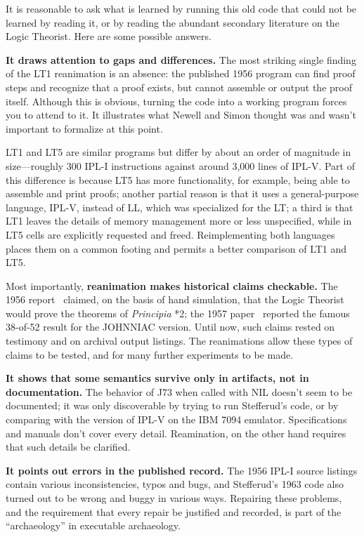 \documentclass[journal]{IEEEtran}
\begin{document}
%
%

It is reasonable to ask what is learned by running this old code that
could not be learned by reading it, or by reading the abundant
secondary literature on the Logic Theorist. Here are some
possible answers.

\textbf{It draws attention to gaps and differences.}
The most striking single finding of the LT1 reanimation is an
absence: the published 1956 program can find proof steps and 
recognize that a proof exists, but cannot assemble
or output the proof itself.  Although this is obvious, turning
the code into a working program forces you to attend to it. 
It illustrates what Newell and Simon
thought was and wasn't important to formalize at this point.

LT1 and LT5 are similar programs but
differ by about an order of magnitude in size---roughly 300
IPL-I instructions against around 3,000 lines of
IPL-V.  Part of this difference is because LT5 has more
functionality, for example, being able to
assemble and print proofs; another partial reason is that it uses
a general-purpose language, IPL-V, instead of LL, which was
specialized for the LT; a third is that LT1 leaves the details
of memory management more or less unspecified, while in LT5
cells are explicitly requested and freed.  Reimplementing 
both languages places them on a common footing and permits a 
better comparison of LT1 and LT5.

Most importantly, \textbf{reanimation makes historical claims checkable.} The 1956
report~\cite{cip1956} claimed, on the basis of hand simulation, that the Logic
Theorist would prove the theorems of \textit{Principia} *2; the 
1957 paper~\cite{LT1957} reported the famous 38-of-52 result for the JOHNNIAC version.
Until now, such claims rested on testimony and on archival output
listings.  The reanimations allow these types of claims to be tested, 
and for many further experiments to be made.

\textbf{It shows that some semantics survive only in artifacts, not
in documentation.}  The behavior of J73 when called with NIL
doesn't seem to be documented; it was
only discoverable by trying to run Stefferud's code, or by
comparing with the version of IPL-V on the IBM 7094 emulator.
Specifications and manuals don't cover every detail. Reamination, on the other hand
requires that such details be clarified.

\textbf{It points out errors in the published record.}  The 1956 
IPL-I source listings contain various inconsistencies, typos and
bugs, and Stefferud's 1963 code also turned out to be wrong and
buggy in various ways.  Repairing these problems, and the requirement
that every repair be justified and recorded, is part of the ``archaeology''
in executable archaeology.
\end{document}
